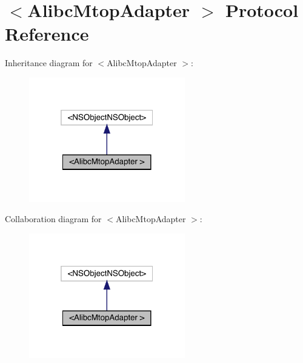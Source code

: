 \hypertarget{protocol_alibc_mtop_adapter_01-p}{}\section{$<$Alibc\+Mtop\+Adapter $>$ Protocol Reference}
\label{protocol_alibc_mtop_adapter_01-p}


Inheritance diagram for $<$Alibc\+Mtop\+Adapter $>$\+:\nopagebreak
\begin{figure}[H]
\begin{center}
\leavevmode
\includegraphics[width=193pt]{protocol_alibc_mtop_adapter_01-p__inherit__graph}
\end{center}
\end{figure}


Collaboration diagram for $<$Alibc\+Mtop\+Adapter $>$\+:\nopagebreak
\begin{figure}[H]
\begin{center}
\leavevmode
\includegraphics[width=193pt]{protocol_alibc_mtop_adapter_01-p__coll__graph}
\end{center}
\end{figure}
